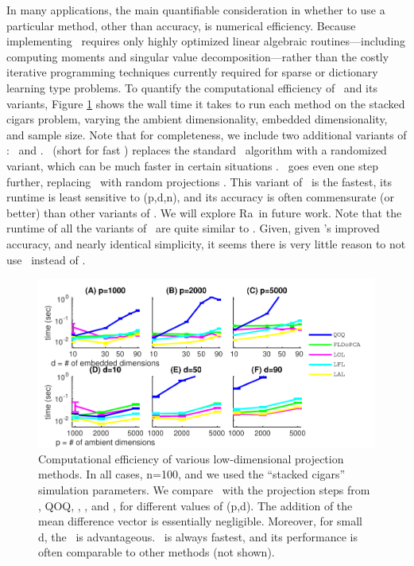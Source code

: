 \documentclass[10pt]{article}
\begin{document}
In many applications, the main quantifiable consideration in whether to use a particular method, other than accuracy, is numerical efficiency.  Because implementing \Lol~requires only highly optimized linear algebraic routines---including computing moments and singular value decomposition---rather than the costly iterative programming techniques currently required for sparse or dictionary learning type problems.  To quantify the computational efficiency of \Lol~and its variants, Figure \ref{fig:speed} shows the wall time it takes to run each method on the stacked cigars problem, varying the ambient dimensionality, embedded dimensionality, and sample size.  Note that for completeness, we include two additional variants of \Lol: \Lal~and \Lfl.  \Lfl~(short for fast \Lol) replaces the standard \Svd~algorithm with a randomized variant, which can be much faster in certain situations \cite{Halko2011a}.  \Lal~goes even one step further, replacing \Svd~with random projections \cite{Candes2006a}.  This variant of \Lol~is the fastest, its runtime is  least sensitive to (p,d,n), and its accuracy is often commensurate (or better) than other variants of \Lol.  We will explore Ra\Lol~in future work.  Note that the runtime of all the variants of \Lol~are quite similar to .  Given, given \Lol's improved accuracy, and nearly identical simplicity, it seems there is very little reason to not use \Lol~instead of .

\begin{figure}[h!]
\centering
\includegraphics[width=1\linewidth]{../Figs/speed_test}
\caption{
Computational efficiency of various low-dimensional projection methods. In all cases, n=100, and we used the ``stacked cigars'' simulation parameters.   We compare \Pca~with the projection steps from \Lol, QOQ, \Lrl, \Lfl, and \Lal, for different values of (p,d).  The addition of the mean difference vector is essentially negligible.  Moreover, for small d, the \Lfl~is advantageous.  \Lal~is always fastest, and its performance is often comparable to other methods (not shown).
}
\label{fig:speed}
\end{figure}
\end{document}
